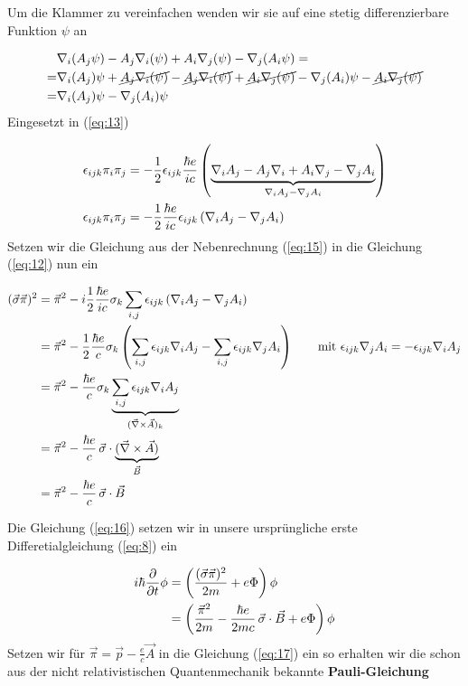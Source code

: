 Um die Klammer zu vereinfachen wenden wir sie auf eine stetig differenzierbare Funktion \(\psi\) an

\begin{align}
  \label{eq:14}
  &\nabla_i (A_j\psi) -A_j\nabla_i(\psi) + A_i\nabla_j(\psi)-\nabla_j(A_i\psi)= \notag\\
  =&\nabla_i (A_j)\psi + \cancel{A_j\nabla_i(\psi)} -\cancel{A_j\nabla_i(\psi)} + \cancel{A_i\nabla_j(\psi)} - \nabla_j(A_i)\psi - \cancel{A_i\nabla_j(\psi)} \notag\\
  =&\nabla_i (A_j)\psi  - \nabla_j(A_i)\psi 
\end{align}
Eingesetzt in (\ref{eq:13})

\begin{align}
  \label{eq:15}
  \epsilon_{ijk}\pi_i\pi_j  &= -\frac{1}{2} \epsilon_{ijk}\frac{\hbar e}{ic} \left( \underbr{\nabla_i A_j-A_j\nabla_i + A_i\nabla_j-\nabla_jA_i}_{\nabla_i A_j  - \nabla_j A_i}\right) \notag\\
  \epsilon_{ijk}\pi_i\pi_j  &= -\frac{1}{2} \frac{\hbar e}{ic}  \epsilon_{ijk}\left( \nabla_i A_j  - \nabla_j A_i\right) \notag\\
\end{align}
Setzen wir die Gleichung aus der Nebenrechnung (\ref{eq:15}) in die Gleichung (\ref{eq:12}) nun ein

\begin{align}
  \label{eq:16}
   (\vec\sigma\vec\pi)^2 &= \vec\pi^2 - i\frac{1}{2} \frac{\hbar e}{ic} \sigma_k \sum_{i,j} \epsilon_{ijk}\left( \nabla_i A_j  - \nabla_j A_i\right) \notag\\
&= \vec\pi^2 - \frac{1}{2} \frac{\hbar e}{c} \sigma_k \left( \sum_{i,j} \epsilon_{ijk}\nabla_i A_j  - \sum_{i,j} \epsilon_{ijk}\nabla_j A_i\right) \qquad\text{mit }\epsilon_{ijk}\nabla_j A_i=-\epsilon_{ijk}\nabla_i A_j \notag\\
&= \vec\pi^2 -  \frac{\hbar e}{c} \sigma_k  \underbr{\sum_{i,j} \epsilon_{ijk}\nabla_i A_j}_{(\vec\nabla \times \vec A)_k }  \notag\\
&= \vec\pi^2 -  \frac{\hbar e}{c}\, \vec \sigma\cdot \underbr{ (\vec\nabla \times \vec A)}_{\vec B}   \notag\\
&= \vec\pi^2 -  \frac{\hbar e}{c}\, \vec \sigma\cdot\vec B 
\end{align}

Die Gleichung (\ref{eq:16}) setzen wir in unsere ursprüngliche erste Differetialgleichung (\ref{eq:8}) ein

\begin{align}
  \label{eq:17}
   i\hbar\pdiff_t\phi &= \left(\frac{(\vec\sigma\vec\pi)^2}{2m}  + e\Phi \right)\phi \notag \\
 &=  \left(\frac{\vec\pi^2}{2m} -  \frac{\hbar e}{2mc}\, \vec \sigma\cdot\vec B   + e\Phi\right) \phi 
\end{align}
Setzen wir für \(\vec\pi = \vec p - \frac{e}{c}\vec A\) in die Gleichung (\ref{eq:17}) ein so erhalten wir die schon aus der nicht relativistischen Quantenmechanik bekannte \textbf{Pauli-Gleichung}

